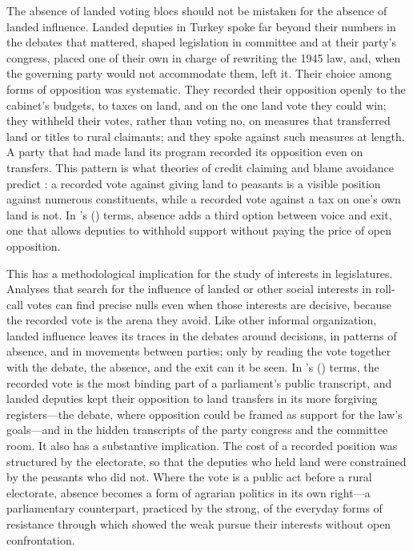 \documentclass[12pt]{article}
\begin{document}
The absence of landed voting blocs should not be mistaken for the absence of landed influence. Landed deputies in Turkey spoke far beyond their numbers in the debates that mattered, shaped legislation in committee and at their party's congress, placed one of their own in charge of rewriting the 1945 law, and, when the governing party would not accommodate them, left it. Their choice among forms of opposition was systematic. They recorded their opposition openly to the cabinet's budgets, to taxes on land, and on the one land vote they could win; they withheld their votes, rather than voting no, on measures that transferred land or titles to rural claimants; and they spoke against such measures at length. A party that had made land its program recorded its opposition even on transfers. This pattern is what theories of credit claiming and blame avoidance predict \citep{mayhew1974,weaver1986}: a recorded vote against giving land to peasants is a visible position against numerous constituents, while a recorded vote against a tax on one's own land is not. In \citeauthor{hirschman1970}'s (\citeyear{hirschman1970}) terms, absence adds a third option between voice and exit, one that allows deputies to withhold support without paying the price of open opposition.

This has a methodological implication for the study of interests in legislatures. Analyses that search for the influence of landed or other social interests in roll-call votes can find precise nulls even when those interests are decisive, because the recorded vote is the arena they avoid. Like other informal organization, landed influence leaves its traces in the debates around decisions, in patterns of absence, and in movements between parties; only by reading the vote together with the debate, the absence, and the exit can it be seen. In \citeauthor{scott1990}'s (\citeyear{scott1990}) terms, the recorded vote is the most binding part of a parliament's public transcript, and landed deputies kept their opposition to land transfers in its more forgiving registers---the debate, where opposition could be framed as support for the law's goals---and in the hidden transcripts of the party congress and the committee room. It also has a substantive implication. The cost of a recorded position was structured by the electorate, so that the deputies who held land were constrained by the peasants who did not. Where the vote is a public act before a rural electorate, absence becomes a form of agrarian politics in its own right---a parliamentary counterpart, practiced by the strong, of the everyday forms of resistance through which \citet{scott1985} showed the weak pursue their interests without open confrontation.
\end{document}
